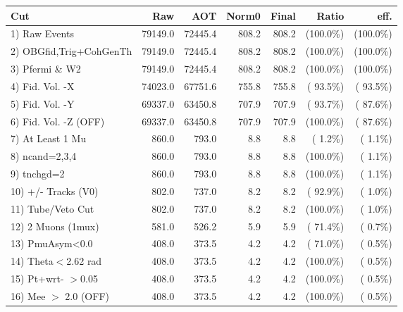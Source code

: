  \begin{table}[h!]\centering
 \begin{tabular}{||l||r|r|r|r|r|r||}
 \hline
 \hline
 Cut & Raw & AOT & Norm0 & Final & Ratio & eff.       \\
 \hline
  1) Raw Events           &      79149.0 &      72445.4 &        808.2 &        808.2 & (100.0\%) & (100.0\%) \\
  2) OBGfid,Trig+CohGenTh &      79149.0 &      72445.4 &        808.2 &        808.2 & (100.0\%) & (100.0\%) \\
  3) Pfermi \& W2         &      79149.0 &      72445.4 &        808.2 &        808.2 & (100.0\%) & (100.0\%) \\
  4) Fid. Vol. -X         &      74023.0 &      67751.6 &        755.8 &        755.8 & ( 93.5\%) & ( 93.5\%) \\
  5) Fid. Vol. -Y         &      69337.0 &      63450.8 &        707.9 &        707.9 & ( 93.7\%) & ( 87.6\%) \\
  6) Fid. Vol. -Z (OFF)   &      69337.0 &      63450.8 &        707.9 &        707.9 & (100.0\%) & ( 87.6\%) \\
  7) At Least 1 Mu        &        860.0 &        793.0 &          8.8 &          8.8 & (  1.2\%) & (  1.1\%) \\
  8) ncand=2,3,4          &        860.0 &        793.0 &          8.8 &          8.8 & (100.0\%) & (  1.1\%) \\
  9) tnchgd=2             &        860.0 &        793.0 &          8.8 &          8.8 & (100.0\%) & (  1.1\%) \\
 10) +/- Tracks (V0)      &        802.0 &        737.0 &          8.2 &          8.2 & ( 92.9\%) & (  1.0\%) \\
 11) Tube/Veto Cut        &        802.0 &        737.0 &          8.2 &          8.2 & (100.0\%) & (  1.0\%) \\
 12) 2 Muons (1mux)       &        581.0 &        526.2 &          5.9 &          5.9 & ( 71.4\%) & (  0.7\%) \\
 13) PmuAsym<0.0          &        408.0 &        373.5 &          4.2 &          4.2 & ( 71.0\%) & (  0.5\%) \\
 14) Theta$<$2.62 rad     &        408.0 &        373.5 &          4.2 &          4.2 & (100.0\%) & (  0.5\%) \\
 15) Pt+wrt- $>$0.05      &        408.0 &        373.5 &          4.2 &          4.2 & (100.0\%) & (  0.5\%) \\
 16) Mee $>$ 2.0  (OFF)   &        408.0 &        373.5 &          4.2 &          4.2 & (100.0\%) & (  0.5\%) \\

\end{tabular}
\end{table}
